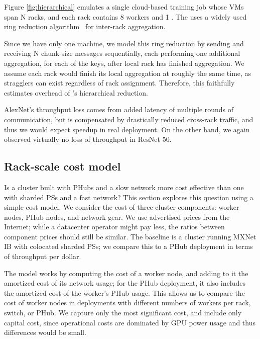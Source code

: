 Figure \ref{fig:hierarchical} emulates a single cloud-based training job whose VMs span N racks, and each rack contains 8 workers and 1 \pbox. The \pbox uses a widely used ring reduction algorithm~\cite{baidures3:online,DBLP:journals/corr/abs-1802-05799} for inter-rack aggregation. 

Since we have only one \pbox machine, we model this ring reduction by sending and receiving N chunk-size messages sequentially, each performing one additional aggregation, for each of the keys, after local rack has finished aggregation. We assume each rack would finish its local aggregation at roughly the same time, as stragglers can exist regardless of rack assignment. Therefore, this faithfully estimates overhead of \phub{}'s hierarchical reduction.

AlexNet's throughput loss comes from added latency of multiple rounds of communication, but is compensated by drastically reduced cross-rack traffic, and thus we would expect speedup in real deployment. On the other hand, we again observed virtually no loss of throughput in ResNet 50.

\subsection{Rack-scale cost model}

Is a cluster built with PHubs and a slow network more cost effective than one with sharded PSs and a fast network? This section explores this question using a simple cost model. We consider the cost of three cluster components: worker nodes, PHub nodes, and network gear. We use advertised prices from the Internet; while a datacenter operator might pay less, the ratios between component prices should still be similar. The baseline is a cluster running MXNet IB with colocated sharded PSs; we compare this to a PHub deployment in terms of throughput per dollar.

The model works by computing the cost of a worker node, and adding to it the amortized cost of its network usage; for the PHub deployment, it also includes the amortized cost of the worker's PHub usage. This allows us to compare the cost of worker nodes in deployments with different numbers of workers per rack, switch, or PHub. We capture only the most significant cost, and include only capital cost, since operational costs are dominated by GPU power usage and thus differences would be small.


